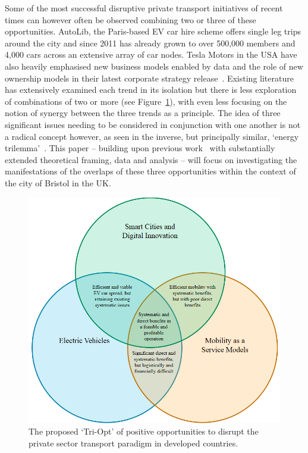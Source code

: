 \documentclass[b5paper,10pt]{article}
\begin{document}
Some of the most successful disruptive private transport initiatives
of recent times can however often be observed combining two or three
of these opportunities. AutoLib, the Paris-based EV car hire scheme
offers single leg trips around the city and since 2011 has already
grown to over 500,000 members and 4,000 cars across an extensive array
of car nodes. Tesla Motors in the USA have also heavily emphasised new
business models enabled by data and the role of new ownership models
in their latest corporate strategy release~\citep{musk:2016}. Existing
literature has extensively examined each trend in its isolation but
there is less exploration of combinations of two or more (see
Figure~\ref{fig:triopt}), with even less focusing on the notion of
synergy between the three trends as a principle. The idea of three
significant issues needing to be considered in conjunction with one
another is not a radical concept however, as seen in the inverse, but
principally similar, `energy trilemma'~\citep{wec:2015}. This paper --
building upon previous work~\citep{cooper-et-al-sose:2015} with
substantially extended theoretical framing, data and analysis -- will
focus on investigating the manifestations of the overlaps of these
three opportunities within the context of the city of Bristol in the
UK.

\begin{figure}[htb]
\centering
\includegraphics[width=0.6\columnwidth]{images/triopt.png}
\caption{The proposed `Tri-Opt' of positive opportunities to disrupt
  the private sector transport paradigm in developed countries.}
\label{fig:triopt}
\end{figure}

\end{document}
